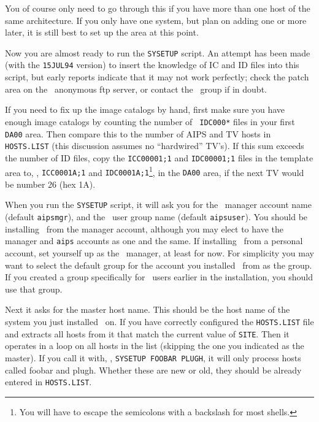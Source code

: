 \medskip

\noindent You of course only need to go through this if you have more than
one host of the same architecture.  If you only have one system, but plan
on adding one or more later, it is still best to set up the area at this
point.

Now you are almost ready to run the {\tt SYSETUP} script.  An attempt has
been made (with the {\tt 15JUL94} version)
to insert the knowledge of IC and ID files into this script, but early
reports indicate that it may not work perfectly; check the patch area on
the \AIPS\ anonymous ftp server, or contact the \AIPS\ group if in doubt.

If you need to fix up the image catalogs by hand, first make
sure you have enough image catalogs by counting the number of {\tt
IDC000*} files in your first {\tt\dol DA00} area.  Then compare this to the
number of AIPS and TV hosts in {\tt HOSTS.LIST} (this discussion assumes
no ``hardwired'' TV's).  If this sum exceeds the number of ID files, copy
the {\tt ICC00001;1} and {\tt IDC00001;1} files in the template area to,
\eg, {\tt ICC0001A;1} and {\tt IDC0001A;1}\footnote*{\eightrm You will
       have to escape the semicolons with a backslash for most shells.},
 in the {\tt\dol DA00} area, if the next TV would be number 26 (hex 1A).

When you run the {\tt SYSETUP} script, it will ask you for the
\AIPS\ manager account name (default {\tt aipsmgr}), and the \AIPS\ user
group name (default {\tt aipsuser}).  You should be installing
\AIPS\ from the manager account, although you may elect to have the
manager and {\tt aips} accounts as one and the same.  If installing
\AIPS\ from a personal account, set yourself up as the \AIPS\ manager,
at least for now.  For simplicity you may want to select the default
group for the account you installed \AIPS\ from as the group.  If you
created a group specifically for \AIPS\ users earlier in the
installation, you should use that group.

Next it asks for the master host name.  This should be the host name of
the system you just installed \AIPS\ on.  If you have correctly
configured the {\tt HOSTS.LIST} file and extracts all hosts from it that
match the current value of {\tt \dol SITE}.  Then it operates in a loop on
all hosts in the list (skipping the one you indicated as the master).
If you call it with, \eg, {\tt SYSETUP FOOBAR PLUGH}, it will only
process hosts called foobar and plugh.  Whether these are new or old,
they should be already entered in {\tt HOSTS.LIST}.

